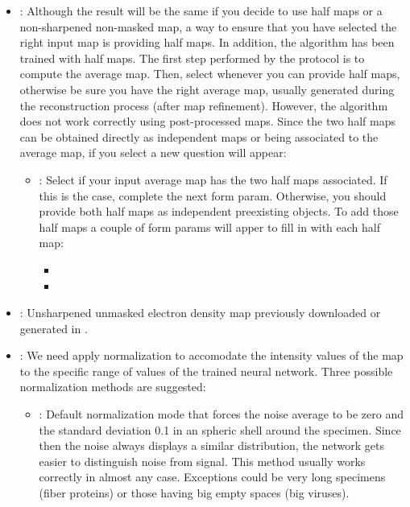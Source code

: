 \begin{itemize}
    \begin{itemize}
        \item {}: Although the result will be the same if you decide to use half maps or a non-sharpened non-masked map, a way to ensure that you have selected the right input map is providing half maps. In addition, the algorithm has been trained with half maps. The first step performed by the protocol is to compute the average map. Then, select  whenever you can provide half maps, otherwise be sure you have the right average map, usually generated during the reconstruction process (after map refinement). However, the algorithm does not work correctly using post-processed maps. Since the two half maps can be obtained directly as independent maps or being associated to the average map, if you select  a new question will appear:
            \begin{itemize}
            \item {}: Select  if your input average map has the two half maps associated. If this is the case, complete the next form param. Otherwise, you should provide both half maps as independent preexisting \scipion objects. To add those half maps a couple of form params will apper to fill in with each half map:
                \begin{itemize}
                \item {}
                \item {}
                \end{itemize}
            \end{itemize}
        \item {}: Unsharpened unmasked electron density map previously downloaded or generated in \scipion.
        \item {}: We need apply normalization to accomodate the intensity values of the map to the specific range of values of the trained neural network. Three possible normalization methods are suggested:
        \begin{itemize}
            \item {}: Default normalization mode that forces the noise average to be zero and the standard deviation 0.1 in an spheric shell around the specimen. Since then the noise always displays a similar distribution, the network gets easier to distinguish noise from signal. This method usually works correctly in almost any case. Exceptions could be very long specimens (fiber proteins) or those having big empty spaces (big viruses).

\end{itemize}
\end{itemize}
\end{itemize}
